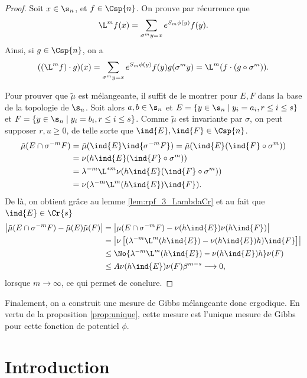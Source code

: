   \begin{proof}
    Soit $x \in \s_n$, et $f \in \Csp{n}$. On prouve par récurrence que
    $$\L^mf(x) = \sum_{\sigma^my=x}{e^{S_m\phi(y)}f(y)}.$$
    Ainsi, si $g \in \Csp{n}$, on a
    $$((\L^mf)\cdot g)(x) = \sum_{\sigma^my = x}{e^{S_m\phi(y)}f(y)g(\sigma^my)} = \L^m(f\cdot(g\circ\sigma^m)).$$

    Pour prouver que $\tilde\mu$ est mélangeante, il suffit de le montrer pour $E, F$ dans la base de la topologie de $\s_n$.
    Soit alors $a, b \in \s_n$ et $E = \{y \in \s_n \mid y_i = a_i, r \leq i \leq s \}$ et $F = \{y \in \s_n \mid y_i = b_i, r \leq i \leq s \}$.
    Comme $\tilde\mu$ est invariante par $\sigma$, on peut supposer $r, u \geq 0$, de telle sorte que $\ind{E}, \ind{F} \in \Csp{n}$.
    \begin{align*}
      \tilde\mu(E\cap\sigma^{-m}F) &= \tilde\mu(\ind{E}\ind{\sigma^{-m}F}) = \tilde\mu(\ind{E}(\ind{F}\circ\sigma^m)) \\
				   &= \nu(h\ind{E}(\ind{F}\circ\sigma^m)) \\
				   &= \lambda^{-m}\L^{*m}\nu(h\ind{E}(\ind{F}\circ\sigma^m)) \\
				   &= \nu(\lambda^{-m}\L^m(h\ind{E})\ind{F}).
    \end{align*}
    De là, on obtient grâce au lemme \ref{lem:rpf_3_LambdaCr} et au fait que $\ind{E} \in \Cr{s}$
    \begin{align*}
      \left|\tilde\mu(E\cap\sigma^{-m}F)-\tilde\mu(E)\tilde\mu(F)\right| &= \left|\mu(E\cap\sigma^{-m}F) - \nu(h\ind{E})\nu(h\ind{F})\right| \\
									 &= \left|\nu\left[(\lambda^{-m}\L^m(h\ind{E})-\nu(h\ind{E})h)\ind{F}\right]\right| \\
									 &\leq \No{\lambda^{-m}\L^m(h\ind{E}) - \nu(h\ind{E})h}\nu(F) \\
									 &\leq A\nu(h\ind{E})\nu(F)\beta^{m-s} \longrightarrow 0,
    \end{align*}
    lorsque $m \to \infty$, ce qui permet de conclure.
  \end{proof}

  Finalement, on a construit une mesure de Gibbs mélangeante donc ergodique. En vertu de la proposition \ref{prop:unique},
  cette mesure est l'unique mesure de Gibbs pour cette fonction de potentiel $\phi$.


\section{Introduction}

